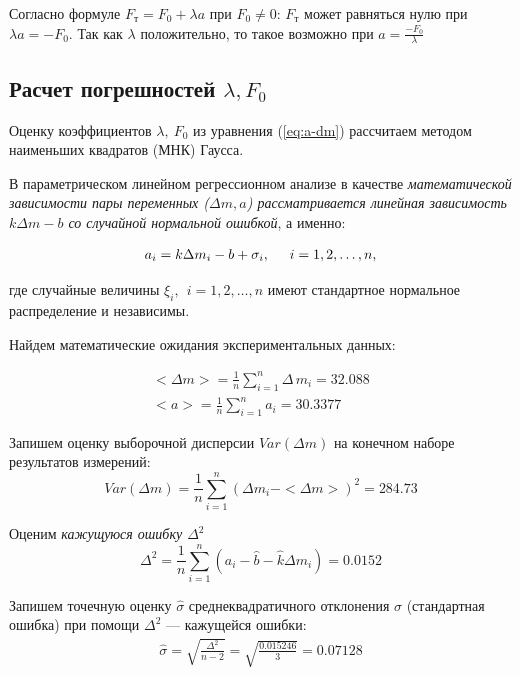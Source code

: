\documentclass[a4paper,12pt]{report}
\newcommand{\dm}{\Delta{}m}
\begin{document}
Согласно формуле $F_\text{т}=F_0+\lambda{a}$ при $F_0\ne0$: $F_\text{т}$ может равняться нулю при $\lambda{a}=-F_0$. Так как $\lambda$ положительно, то такое возможно при $a=\frac{-F_0}{\lambda}$

\subsection{Расчет погрешностей $\lambda, F_0$}
Оценку коэффициентов $\lambda,\ F_0$ из уравнения (\ref{eq:a-dm}) рассчитаем методом наименьших квадратов (МНК) Гаусса.

В параметрическом линейном регрессионном анализе в качестве \textit{математической зависимости пары переменных ($\Delta{m}, a$) рассматривается линейная зависимость $k\Delta{m}-b$ со случайной нормальной ошибкой}, а именно:

\begin{gather}
	a_i=k\Delta{m}_i-b+\sigma_i,\hspace{0.5cm}   i=1,2,\ldots,n,
\end{gather}

где случайные величины $\xi_i,\ \ i=1,2,\ldots,n$ имеют стандартное нормальное
распределение и независимы.

Найдем математические ожидания экспериментальных данных:

\begin{gather}
	<\Delta{}m>=\frac{1}{n}\sum\limits_{i=1}^{n}\Delta\,m_i=32.088\\\nonumber
	<a>=\frac{1}{n}\sum\limits_{i=1}^{n}a_i=30.3377
\end{gather}

Запишем оценку выборочной дисперсии $Var(\dm)$ на конечном наборе результатов измерений:
\begin{equation}
	Var(\dm)=\frac{1}{n}\sum\limits_{i=1}^{n}(\dm_i-<\dm>)^2=284.73
\end{equation}

Оценим \textit{кажущуюся ошибку $\Delta^2$ }
\begin{equation}
	\Delta^2=\frac{1}{n}\sum\limits_{i=1}^{n}(a_i-\hat{b}-\hat{k}\Delta{}m_i)=0.0152
\end{equation}

Запишем точечную оценку $\hat{\sigma}$ среднеквадратичного отклонения $\sigma$ (стандартная ошибка) при помощи $\Delta^2$ --- кажущейся ошибки:
\begin{gather}
	\hat{\sigma}=\sqrt{\frac{\Delta^2}{n-2}}=\sqrt{\frac{0.015246}{3}}=0.07128
\end{gather}
\end{document}
